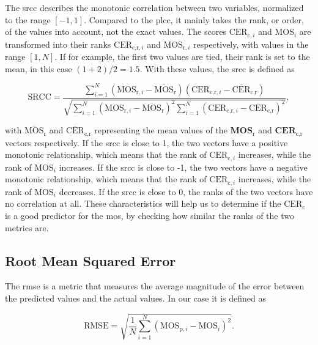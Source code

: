 The \gls{srcc} \cite{pears_spear_2016} describes the monotonic correlation between two variables, normalized to the range $[-1, 1]$.
Compared to the \gls{plcc}, it mainly takes the rank, or order, of the values into account, not the exact values.
The scores $\text{CER}_{\text{c},i}$ and $\text{MOS}_{i}$ are transformed into their ranks $\text{CER}_{\text{c,r},i}$ and $\text{MOS}_{\text{r},i}$ respectively, with values in the range $[1, N]$.
If for example, the first two values are tied, their rank is set to the mean, in this case $(1+2)/2 = 1.5$.
With these values, the \gls{srcc} is defined as

\begin{equation}
    \text{SRCC} = \frac{\sum_{i=1}^{N}{(\text{MOS}_{\text{r},i}-\overline{\text{MOS}}_{\text{r}})(\text{CER}_{\text{c,r},i}-\overline{\text{CER}}_{\text{c,r}})}}{\sqrt{\sum_{i=1}^{N}{(\text{MOS}_{\text{r},i}-\overline{\text{MOS}}_{\text{r}})^2}\sum_{i=1}^{N}{(\text{CER}_{\text{c,r},i}-\overline{\text{CER}}_{\text{c,r}})^2}}},
    \label{eq:spearman}
\end{equation}

with $\overline{\text{MOS}}_{\text{r}}$ and $\overline{\text{CER}}_{\text{c,r}}$ representing the mean values of the $\mathbf{MOS}_{\text{r}}$ and $\mathbf{CER}_{\text{c,r}}$ vectors respectively.
If the \gls{srcc} is close to 1, the two vectors have a positive monotonic relationship, which means that the rank of $\text{CER}_{\text{c},i}$ increases, while the rank of $\text{MOS}_{i}$ increases.
If the \gls{srcc} is close to -1, the two vectors have a negative monotonic relationship, which means that the rank of $\text{CER}_{\text{c},i}$ increases, while the rank of $\text{MOS}_{i}$ decreases.
If the \gls{srcc} is close to 0, the ranks of the two vectors have no correlation at all.
These characteristics will help us to determine if the $\text{CER}_{\text{c}}$ is a good predictor for the \gls{mos}, by checking how similar the ranks of the two metrics are.


\subsection{Root Mean Squared Error}
\label{subsec:rmse}

The \gls{rmse} is a metric that measures the average magnitude of the error between the predicted values and the actual values.
In our case it is defined as

\begin{equation}
    \text{RMSE} = \sqrt{\frac{1}{N}\sum_{i=1}^{N}{(\text{MOS}_{\text{p},i} - \text{MOS}_{i})^2}}.
    \label{eq:rmse}
\end{equation}


